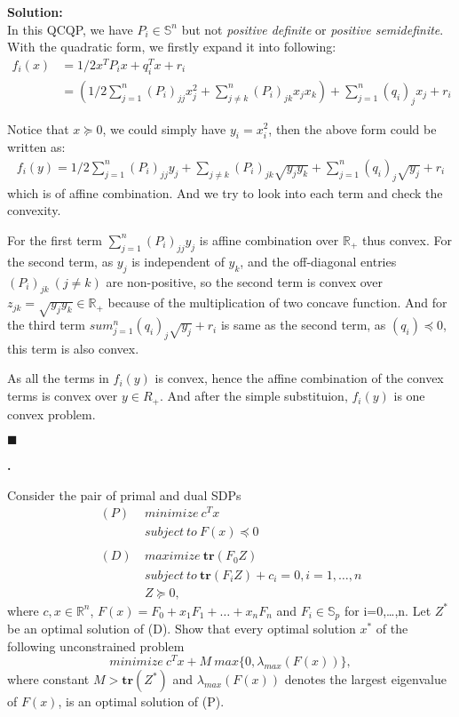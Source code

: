 \documentclass{article}
\newcounter{pcounter}                                   %
\newenvironment{problem}                                %
{                                                       %
    \stepcounter{pcounter}                              %
    \textbf{\arabic{pcounter}.}                         %
}{}                                                     %
\newenvironment{solution}                               %
{\textbf{Solution:} \\}{$\blacksquare$\newline}         %
\newcommand{\domR}{\mathbb{R}}                          %
\newcommand{\domS}{\mathbb{S}}                          %
\newcommand{\tr}[1]{\textbf{tr}(#1)}                    %
\begin{document}
\begin{solution}
    In this QCQP, we have $P_i \in \domS^n$ but not \textit{positive definite} or \textit{positive semidefinite}. With the quadratic form, we firstly expand it into following:
    \begin{align*}
        f_i(x) &= 1/2 x^T P_i x + q_i^T x + r_i \\
        &= (1/2 \sum_{j=1}^n (P_i)_{jj} x_j^2 + \sum_{j \neq k}^n (P_i)_{jk} x_j x_k) + \sum_{j=1}^n (q_i)_j x_j + r_i
    \end{align*}

    Notice that $x \succeq 0$, we could simply have $y_i = x_i^2$, then the above form could be written as:
    \begin{gather*}
       f_i(y) =  1/2 \sum_{j=1}^n (P_i)_{jj} y_j + \sum_{j \neq k} (P_i)_{jk} \sqrt{y_j y_k} + \sum_{j=1}^n (q_i)_j \sqrt{y_j} + r_i
    \end{gather*}
    which is of affine combination. And we try to look into each term and check the convexity.
    
    For the first term $\sum_{j=1}^n (P_i)_{jj} y_j$ is affine combination over $\domR_+$ thus convex.
    For the second term, as $y_j$ is independent of $y_k$, and the off-diagonal entries $(P_i)_{jk}\ (j \neq k)$ are non-positive, so the second term is convex over $z_{jk} = \sqrt{y_j y_k} \in \domR_+$ because of the multiplication of two concave function.
    And for the third term $sum_{j=1}^n (q_i)_j \sqrt{y_j} + r_i$ is same as the second term, as $(q_i) \preceq 0$, this term is also convex.
    
    As all the terms in $f_i(y)$ is convex, hence the affine combination of the convex terms is convex over $y \in R_+$. And after the simple substituion, $f_i(y)$ is one convex problem.

\end{solution}

\begin{problem}
    Consider the pair of primal and dual SDPs
    \begin{align*}
        (P)\ &minimize\ c^T x \\
        &subject\ to\ F(x) \preceq 0 \\
        \\
        (D)\ &maximize\ \tr{F_0 Z} \\
        &subject\ to\ \tr{F_i Z} + c_i = 0, i=1,\dots,n \\
        &Z \succeq 0,
    \end{align*}
    where $c,x \in \domR^n$, $F(x) = F_0+x_1 F_1+\dots+x_n F_n$ and $F_i \in \domS_p$ for i=0,\dots,n. Let $Z^*$ be an optimal solution of (D). Show that every optimal solution $x^*$ of the following unconstrained problem
    \[
        minimize\ c^T x+M\ max\{0, \lambda_{max}(F(x))\},
    \]
    where constant $M > \tr{Z^*}$ and $\lambda_{max}(F(x))$ denotes the largest eigenvalue of $F(x)$, is an optimal solution of (P).
\end{problem}
\end{document}
